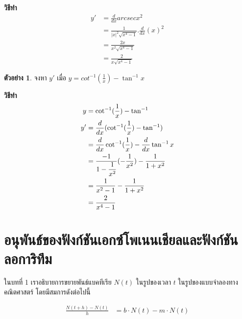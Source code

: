 \documentclass[
]{book}
\theoremstyle{definition}
\theoremstyle{definition}
\newtheorem{example}{ตัวอย่าง}[chapter]
\theoremstyle{definition}
\theoremstyle{definition}
\theoremstyle{remark}
\begin{document}
\textbf{วิธีทำ} \begin{equation}   \begin{aligned}
 \displaystyle y'&=\frac{d}{dx}arcsec
x^{2}\\
&=\displaystyle \frac{1}{|x|^{2}\sqrt{x^{4}-1}}.\frac{d}{dx}(x)^{2}\\
&=\displaystyle \frac{2x}{x^{2}\sqrt{x^{4}-1}}\\
&=\displaystyle \frac{2}{x\sqrt{x^{4}-1}}
  \end{aligned} \end{equation}

\begin{example}
จงหา \(y'\) เมื่อ \(y=cot^{-1}\displaystyle(\frac{1}{x})-\tan^{-1}x\)
\end{example}

\textbf{วิธีทำ} \begin{equation}   \begin{aligned}
\displaystyle y&=\cot^{-1}(\frac{1}{x})-\tan^{-1}\\
\displaystyle y'&=\frac{d}{dx}(\cot^{-1}(\frac{1}{x})-\tan^{-1})\\
\displaystyle &=\frac{d}{dx}\cot^{-1}(\displaystyle
\frac{1}{x})-\frac{d}{dx}\tan^{-1}x\\
\displaystyle &=\frac{-1}{1-\displaystyle
\frac{1}{x^{2}}}(-\frac{1}{x^{2}})-\frac{1}{1+x^{2}}\\
\displaystyle &=\frac{1}{x^{2}-1}-\frac{1}{1+x^{2}}\\
\displaystyle &=\frac{2}{x^{4}-1}
  \end{aligned} \end{equation}


\section{อนุพันธ์ของฟังก์ชันเอกซ์โพเนนเชียลและฟังก์ชันลอการิทึม}\label{uxe2duxe19uxe1euxe19uxe18uxe02uxe2duxe07uxe1fuxe07uxe01uxe0auxe19uxe40uxe2duxe01uxe0buxe42uxe1euxe40uxe19uxe19uxe40uxe0auxe22uxe25uxe41uxe25uxe30uxe1fuxe07uxe01uxe0auxe19uxe25uxe2duxe01uxe32uxe23uxe17uxe21}

ในบทที่ 1 เราอธิบายการขยายพันธ์แบคทีเรีย \(N(t)\) ในรูปของเวลา \(t\)
ในรูปของแบบจำลองทางคณิตศาสตร์ โดยมีสมการดังต่อไปนี้

\begin{align}
\frac{N(t + h) - N(t)}{h} &= b\cdot N(t)  - m\cdot N(t)\\
\label{eq:population-growth-chapter3}
\end{align}
\end{document}
